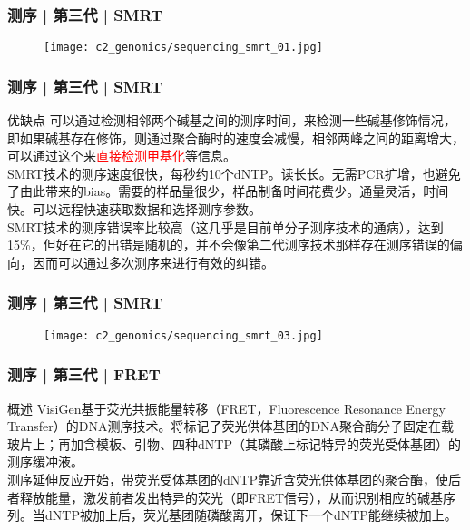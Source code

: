 \begin{frame}
  \frametitle{测序 | 第三代 | SMRT}
  \begin{figure}
    \centering
    \texttt{[image: c2\_genomics/sequencing\_smrt\_01.jpg]}
  \end{figure}
\end{frame}

\begin{frame}
  \frametitle{测序 | 第三代 | SMRT}
  \begin{block}{优缺点}
可以通过检测相邻两个碱基之间的测序时间，来检测一些碱基修饰情况，即如果碱基存在修饰，则通过聚合酶时的速度会减慢，相邻两峰之间的距离增大，可以通过这个来\textcolor{red}{直接检测甲基化}等信息。\\
\vspace{1em}
SMRT技术的测序速度很快，每秒约10个dNTP。读长长。无需PCR扩增，也避免了由此带来的bias。需要的样品量很少，样品制备时间花费少。通量灵活，时间快。可以远程快速获取数据和选择测序参数。\\
\vspace{1em}
SMRT技术的测序错误率比较高（这几乎是目前单分子测序技术的通病），达到15\%，但好在它的出错是随机的，并不会像第二代测序技术那样存在测序错误的偏向，因而可以通过多次测序来进行有效的纠错。
  \end{block}
\end{frame}

\begin{frame}
  \frametitle{测序 | 第三代 | SMRT}
  \begin{figure}
    \centering
    \texttt{[image: c2\_genomics/sequencing\_smrt\_03.jpg]}
  \end{figure}
\end{frame}

\begin{frame}
  \frametitle{测序 | 第三代 | FRET}
  \begin{block}{概述}
VisiGen基于荧光共振能量转移（FRET，Fluorescence Resonance Energy Transfer）的DNA测序技术。将标记了荧光供体基团的DNA聚合酶分子固定在载玻片上；再加含模板、引物、四种dNTP（其磷酸上标记特异的荧光受体基团）的测序缓冲液。\\
\vspace{1em}
测序延伸反应开始，带荧光受体基团的dNTP靠近含荧光供体基团的聚合酶，使后者释放能量，激发前者发出特异的荧光（即FRET信号），从而识别相应的碱基序列。当dNTP被加上后，荧光基团随磷酸离开，保证下一个dNTP能继续被加上。
  \end{block}
\end{frame}

